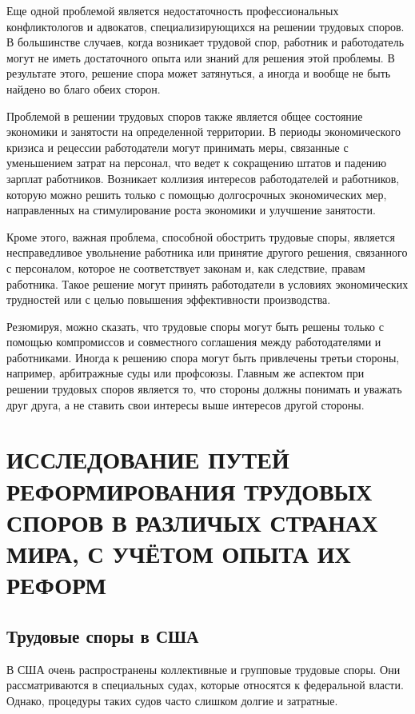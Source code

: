 Еще одной проблемой является недостаточность профессиональных конфликтологов и адвокатов, специализирующихся на решении трудовых споров. В большинстве случаев, когда возникает трудовой спор, работник и работодатель могут не иметь достаточного опыта или знаний для решения этой проблемы. В результате этого, решение спора может затянуться, а иногда и вообще не быть найдено во благо обеих сторон.

Проблемой в решении трудовых споров также является общее состояние экономики и занятости на определенной территории. В периоды экономического кризиса и рецессии работодатели могут принимать меры, связанные с уменьшением затрат на персонал, что ведет к сокращению штатов и падению зарплат работников. Возникает коллизия интересов работодателей и работников, которую можно решить только с помощью долгосрочных экономических мер, направленных на стимулирование роста экономики и улучшение занятости.

Кроме этого, важная проблема, способной обострить трудовые споры, является несправедливое увольнение работника или принятие другого решения, связанного с персоналом, которое не соответствует законам и, как следствие, правам работника. Такое решение могут принять работодатели в условиях экономических трудностей или с целью повышения эффективности производства.

Резюмируя, можно сказать, что трудовые споры могут быть решены только с помощью компромиссов и совместного соглашения между работодателями и работниками. Иногда к решению спора могут быть привлечены третьи стороны, например, арбитражные суды или профсоюзы. Главным же аспектом при решении трудовых споров является то, что стороны должны понимать и уважать друг друга, а не ставить свои интересы выше интересов другой стороны.

\chapter{ИССЛЕДОВАНИЕ ПУТЕЙ РЕФОРМИРОВАНИЯ ТРУДОВЫХ СПОРОВ В РАЗЛИЧЫХ СТРАНАХ МИРА, С УЧЁТОМ ОПЫТА ИХ РЕФОРМ}

\section{Трудовые споры в США}
В США очень распространены коллективные и групповые трудовые споры. Они рассматриваются в специальных судах, которые относятся к федеральной власти. Однако, процедуры таких судов часто слишком долгие и затратные.


